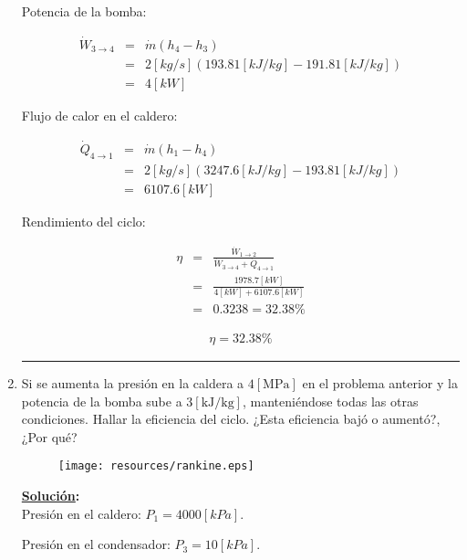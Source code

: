 \documentclass[letter,10pt]{article}
\begin{document}
\begin{enumerate}
Potencia de la bomba:

\begin{eqnarray*}
    \dot{W}_{3\rightarrow4} &=& \dot{m}(h_4 - h_3) \\
                            &=& 2[kg/s](193.81[kJ/kg]-191.81[kJ/kg]) \\
                            &=& 4[kW]
\end{eqnarray*}

Flujo de calor en el caldero:

\begin{eqnarray*}
    \dot{Q}_{4\rightarrow1} &=& \dot{m}(h_1 - h_4) \\
                            &=& 2[kg/s](3247.6[kJ/kg]-193.81[kJ/kg]) \\
                            &=& 6107.6[kW]
\end{eqnarray*}

Rendimiento del ciclo:

\begin{eqnarray*}
    \eta &=& \frac{\dot{W}_{1\rightarrow2}}
             {\dot{W}_{3\rightarrow4}+\dot{Q}_{4\rightarrow1}} \\
         &=& \frac{1978.7[kW]}{4[kW]+6107.6[kW]} \\
         &=& 0.3238 = 32.38\%
\end{eqnarray*}

\begin{equation*}
\boxed{
    \begin{array}{l}
        \eta = 32.38\%
    \end{array}
}
\end{equation*}

\noindent\rule{15.2cm}{0.4pt}

\item Si se aumenta la presión en la caldera a $4[\text{MPa}]$ en el problema
anterior y la potencia de la bomba sube a $3[\text{kJ}/\text{kg}]$,
manteniéndose todas las otras condiciones. Hallar la eficiencia del ciclo. ¿Esta
eficiencia bajó o aumentó?, ¿Por qué?

\begin{figure}[H]
\centering
\texttt{[image: resources/rankine.eps]}
\end{figure}

\textbf{\underline{Solución}:} \\

Presión en el caldero: $P_1 = 4000[kPa]$.

Presión en el condensador: $P_3 = 10[kPa]$.


\end{enumerate}
\end{document}

